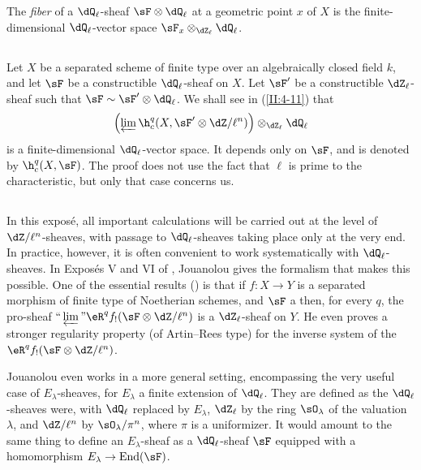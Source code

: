The \emph{fiber} of a $\dQ_\ell$-sheaf $\sF\otimes\dQ_\ell$ at a geometric
point $x$ of $X$ is the finite-dimensional $\dQ_\ell$-vector space
$\sF_x\otimes_{\dZ_\ell}\dQ_\ell$.






\subsection{}\label{II:2-10}

Let $X$ be a separated scheme of finite type over an algebraically closed
field $k$, and let $\sF$ be a constructible $\dQ_\ell$-sheaf on $X$. Let
$\sF'$ be a constructible $\dZ_\ell$-sheaf such that
$\sF\sim \sF'\otimes\dQ_\ell$. We shall see in
(\ref{II:4-11}) that
\[
  \left(\varprojlim \h_c^q(X,\sF'\otimes \dZ/\ell^n)\right)\otimes_{\dZ_\ell}\dQ_\ell
\]
is a finite-dimensional $\dQ_\ell$-vector space. It depends only on $\sF$,
and is denoted by $\h_c^q(X,\sF)$. The proof does not use the fact that
$\ell$ is prime to the characteristic, but only that case concerns us.






\subsection{}\label{II:2-11}

In this exposé, all important calculations will be carried out at the level
of $\dZ/\ell^n$-sheaves, with passage to $\dQ_\ell$-sheaves taking place only
at the very end. In practice, however, it is often convenient to work
systematically with $\dQ_\ell$-sheaves. In Exposés V and VI of
\cite{sga5}, Jouanolou gives the formalism that makes this possible. One of
the essential results (\cite[VI 2.2]{sga5}) is that if $f:X\to Y$ is a separated morphism
of finite type of Noetherian schemes, and $\sF$ a 
then, for every $q$, the pro-sheaf
$\text{``}\varprojlim\text{''}\eR^q f_! (\sF\otimes\dZ/\ell^n)$ is a
$\dZ_\ell$-sheaf on $Y$. He even proves a stronger regularity property (of
Artin--Rees type) for the inverse system of the
$\eR^q f_!(\sF\otimes\dZ/\ell^n)$.

Jouanolou even works in a more general setting, encompassing the very useful
case of $E_\lambda$-sheaves, for $E_\lambda$ a finite extension of
$\dQ_\ell$. They are defined as the $\dQ_\ell$-sheaves were, with
$\dQ_\ell$ replaced by $E_\lambda$, $\dZ_\ell$ by the ring $\sO_\lambda$ of
the valuation $\lambda$, and $\dZ/\ell^n$ by $\sO_\lambda/\pi^n$, where
$\pi$ is a uniformizer. It would amount to the same thing to define an
$E_\lambda$-sheaf as a $\dQ_\ell$-sheaf $\sF$ equipped with a homomorphism
$E_\lambda\to\operatorname{End}(\sF)$.









